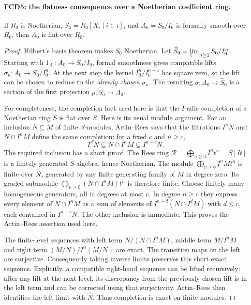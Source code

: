 \documentclass[11pt,a4paper]{article}
\numberwithin{equation}{section}
\theoremstyle{remark}\newtheorem{remark}[theorem]{Remark}
\begin{document}
\paragraph{FCD5: the flatness consequence over a Noetherian coefficient ring.}
\label{claim:FCD5}
If $R_0$ is Noetherian, $S_0=R_0[X_i\mid i\in\iota]$, and
$A_0=S_0/I_0$ is formally smooth over $R_0$, then $A_0$ is
flat over $R_0$.

\begin{proof}
Hilbert's basis theorem makes $S_0$ Noetherian.  Let
$\widehat S_0=\varprojlim_{n\ge1}S_0/I_0^n$.
Starting with $1_{A_0}:A_0\to S_0/I_0$, formal smoothness gives
compatible lifts $\sigma_n:A_0\to S_0/I_0^n$.
At the next step the kernel $I_0^n/I_0^{n+1}$ has square zero,
so the lift can be chosen to reduce to the \emph{already chosen}
$\sigma_n$.  The resulting $\sigma:A_0\to\widehat S_0$
is a section of the first projection $p:\widehat S_0\to A_0$.

For completeness, the completion fact used here is that the
$I$-adic completion of a Noetherian ring $S$ is flat over $S$.
Here is its usual module argument.  For an inclusion $N\subseteq M$
of finite $S$-modules, Artin--Rees says that the filtrations
$I^nN$ and $N\cap I^nM$ define the same completion: for a fixed
$c$ and $n\ge c$,
\[
 I^nN\subseteq N\cap I^nM\subseteq I^{n-c}N.
\]
The required inclusion has a short proof.  The Rees ring
$\mathcal R=\bigoplus_{n\ge0}I^nt^n=S[It]$ is a finitely
generated $S$-algebra, hence Noetherian.  The module
$\bigoplus_{n\ge0}I^nMt^n$ is finite over $\mathcal R$,
generated by any finite generating family of $M$ in degree zero.
Its graded submodule
$\bigoplus_{n\ge0}(N\cap I^nM)t^n$ is therefore finite.
Choose finitely many homogeneous generators, all in degrees at
most $c$.  In degree $n\ge c$ they express every element of
$N\cap I^nM$ as a sum of elements of
$I^{n-d}(N\cap I^dM)$ with $d\le c$, each contained in
$I^{n-c}N$.  The other inclusion is immediate.  This proves
the Artin--Rees assertion used here.

The finite-level sequences with left term
$N/(N\cap I^nM)$, middle term $M/I^nM$ and right term
$(M/N)/I^n(M/N)$ are exact.  The transition maps on the left
are surjective.  Consequently taking inverse limits preserves this
short exact sequence.  Explicitly, a compatible right-hand sequence
can be lifted recursively: after any lift at the next level, its
discrepancy from the previously chosen lift is in the left term and
can be corrected using that surjectivity.  Artin--Rees then identifies
the left limit with $\widehat N$.  Thus completion is exact on
finite modules.


\end{proof}
\end{document}
